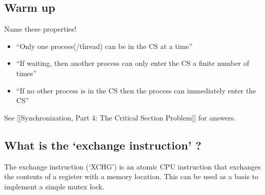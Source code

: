 \subsection{Warm up}\label{warm-up}

Name these properties!

\begin{itemize}
\itemsep1pt\parskip0pt
\item
  ``Only one process(/thread) can be in the CS at a time''
\item
  ``If waiting, then another process can only enter the CS a finite
  number of times''
\item
  ``If no other process is in the CS then the process can immediately
  enter the CS''
\end{itemize}

See {[}{[}Synchronization, Part 4: The Critical Section Problem{]}{]}
for answers.

\subsection{\texorpdfstring{What is the `exchange instruction'
?}{What is the exchange instruction ?}}\label{what-is-the-exchange-instruction}

The exchange instruction (`XCHG') is an atomic CPU instruction that
exchanges the contents of a register with a memory location. This can be
used as a basis to implement a simple mutex lock.

\begin{Shaded}
\begin{Highlighting}[]
 \NormalTok{; }

 \NormalTok{\}}
\NormalTok{;}
\end{Highlighting}
\end{Shaded}

